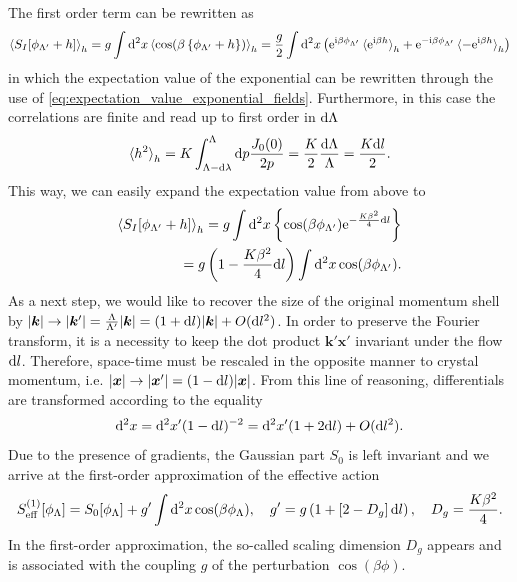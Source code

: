 The first order term can be rewritten as
\begin{align}
    \braket{S_I[\phi_{\Lambda'}+h]}_h = g\int\mathrm d^2x\braket{\cos(\beta\left\{ \phi_{\Lambda'}+h \right\})}_h
    = \frac g2\int\mathrm d^2x\left( \mathrm e^{\mathrm i\beta \phi_{\Lambda'}}\braket{\mathrm e^{\mathrm i\beta h}}_h+\mathrm e^{-\mathrm i\beta \phi_{\Lambda'}}\braket{-\mathrm e^{\mathrm i\beta h}}_h \right)
\end{align}
in which the expectation value of the exponential can be rewritten through the use of \cref{eq:expectation_value_exponential_fields}.
Furthermore, in this case the correlations are finite and read up to first order in $\mathrm d\Lambda$
\begin{align}
    \braket{h^2}_h = K\int_{\Lambda-\mathrm d\lambda}^\Lambda\mathrm d p\frac{J_0(0)}{2p} = \frac K2\frac{\mathrm d\Lambda}\Lambda = \frac{K\mathrm d l}2.
    \label{eq:rg_hsq}
\end{align}
This way, we can easily expand the expectation value from above to
\begin{align}
    \braket{S_I[\phi_{\Lambda'}+h]}_h
    = g\int\mathrm d^2x\left\{ \cos(\beta \phi_{\Lambda'})\mathrm e^{-\frac{K\beta^2}4\mathrm d l} \right\}
    \\
    = g\left( 1 - \frac{K\beta^2}4\mathrm d l \right)\int\mathrm d^2x\cos(\beta \phi_{\Lambda'}).
\end{align}
As a next step, we would like to recover the size of the original momentum shell by $|{\bm k}|\rightarrow |{\bm k}'|=\frac{\Lambda}{\Lambda'}|{\bm k}| = (1+\mathrm d l)|{\bm k}|+O(\mathrm d l^2)$.
In order to preserve the Fourier transform, it is a necessity to keep the dot product ${\bm k'}{\bm x'}$ invariant under the flow $\mathrm d l$.
Therefore, space-time must be rescaled in the opposite manner to crystal momentum, i.e. $|{\bm x}|\rightarrow|{\bm x'}|=(1-\mathrm d l)|{\bm x}|$.
From this line of reasoning, differentials are transformed according to the equality
\begin{align}
    \mathrm d^2x = \mathrm d^2 x'(1-\mathrm d l)^{-2} = \mathrm d^2 x'(1+2\mathrm d l) + O(\mathrm d l^2).
\end{align}
Due to the presence of gradients, the Gaussian part $S_0$ is left invariant and we arrive at the first-order approximation of the effective action
\begin{align}
    S^{(1)}_{\rm eff}[\phi_\Lambda]=S_0[\phi_\Lambda] + g'\int\mathrm d^2x\cos(\beta \phi_{\Lambda}),
    \quad
    g' = g\left( 1 + \left[ 2-D_g \right]\mathrm d l \right),
    \quad
    D_g=\frac{K\beta^2}4.
    \label{eq:bkt_first_order}
\end{align}
In the first-order approximation, the so-called scaling dimension $D_g$ appears and is associated with the coupling $g$ of the perturbation $\cos(\beta\phi)$.

